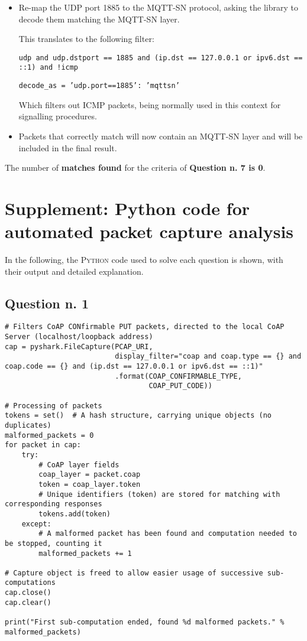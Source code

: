 \documentclass[a4paper,11pt]{article} %
\begin{document}
    \begin{itemize}
        \item Re-map the \textsc{UDP} port 1885 to the \textsc{MQTT-SN} protocol, asking the library to decode them matching the \textsc{MQTT-SN} layer.

        This translates to the following filter:

        \texttt{udp and udp.dstport == 1885 and (ip.dst == 127.0.0.1 or ipv6.dst == ::1) and !icmp}

        \texttt{decode\_as = 'udp.port==1885': 'mqttsn'}

        Which filters out \textsc{ICMP} packets, being normally used in this context for signalling procedures.
        \item Packets that correctly match will now contain an \textsc{MQTT-SN} layer and will be included in the final result.
    \end{itemize}

    The number of \textbf{matches found} for the criteria of \textbf{Question n. 7 is 0}.


    \section{Supplement: Python code for automated packet capture analysis}\label{sec:supplmement:-python-code-for-automated-packet-capture-analysis}

    In the following, the \textsc{Python} code used to solve each question is shown, with their output and detailed explanation.

    \subsection{Question n. 1}\label{subsec:question-n.-1}

    \begin{verbatim}
# Filters CoAP CONfirmable PUT packets, directed to the local CoAP Server (localhost/loopback address)
cap = pyshark.FileCapture(PCAP_URI,
                          display_filter="coap and coap.type == {} and coap.code == {} and (ip.dst == 127.0.0.1 or ipv6.dst == ::1)"
                          .format(COAP_CONFIRMABLE_TYPE,
                                  COAP_PUT_CODE))

# Processing of packets
tokens = set()  # A hash structure, carrying unique objects (no duplicates)
malformed_packets = 0
for packet in cap:
    try:
        # CoAP layer fields
        coap_layer = packet.coap
        token = coap_layer.token
        # Unique identifiers (token) are stored for matching with corresponding responses
        tokens.add(token)
    except:
        # A malformed packet has been found and computation needed to be stopped, counting it
        malformed_packets += 1

# Capture object is freed to allow easier usage of successive sub-computations
cap.close()
cap.clear()

print("First sub-computation ended, found %d malformed packets." % malformed_packets)
    \end{verbatim}
\end{document}
